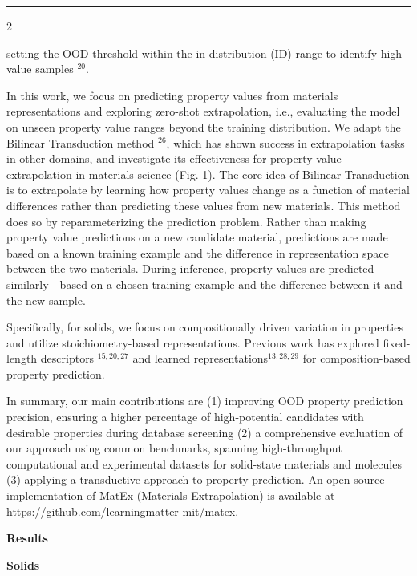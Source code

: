 \documentclass[10pt]{article}
\begin{document}
\vspace{10pt}
{\color{rulegray}\rule{\textwidth}{1pt}}

\vspace{8pt}
\begin{multicols}{2}
{\fontsize{10.2}{13.8}\selectfont
setting the OOD threshold within the in-distribution (ID) range to identify high-value samples $^{20}$.

In this work, we focus on predicting property values from materials representations and exploring zero-shot extrapolation, i.e., evaluating the model on unseen property value ranges beyond the training distribution. We adapt the Bilinear Transduction method $^{26}$, which has shown success in extrapolation tasks in other domains, and investigate its effectiveness for property value extrapolation in materials science (Fig. 1). The core idea of Bilinear Transduction is to extrapolate by learning how property values change as a function of material differences rather than predicting these values from new materials. This method does so by reparameterizing the prediction problem. Rather than making property value predictions on a new candidate material, predictions are made based on a known training example and the difference in representation space between the two materials. During inference, property values are predicted similarly - based on a chosen training example and the difference between it and the new sample.

Specifically, for solids, we focus on compositionally driven variation in properties and utilize stoichiometry-based representations. Previous work has explored fixed-length descriptors $^{15,20,27}$ and learned representations$^{13,28,29}$ for composition-based property prediction.

In summary, our main contributions are (1) improving OOD property prediction precision, ensuring a higher percentage of high-potential candidates with desirable properties during database screening (2) a comprehensive evaluation of our approach using common benchmarks, spanning high-throughput computational and experimental datasets for solid-state materials and molecules (3) applying a transductive approach to property prediction. An open-source implementation of MatEx (Materials Extrapolation) is available at \textcolor{npjblue}{\href{https://github.com/learningmatter-mit/matex}{https://github.com/learningmatter-mit/matex}}.

{\bfseries\fontsize{16}{18}\selectfont Results}

{\bfseries\fontsize{14}{16}\selectfont Solids}

}
\end{multicols}
\end{document}
